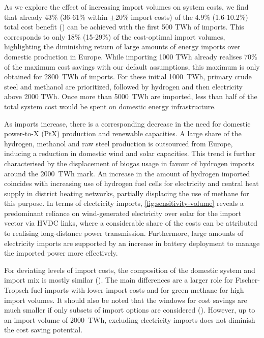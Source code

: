 As we explore the effect of increasing import volumes on system costs, we find
that already 43\% (36-61\% within $\pm$20\% import costs) of the 4.9\%
(1.6-10.2\%) total cost benefit () can be achieved with the first 500
TWh of imports. This corresponds to only 18\% (15-29\%) of the cost-optimal
import volumes, highlighting the diminishing return of large amounts of energy
imports over domestic production in Europe. While importing 1000 TWh already
realises 70\% of the maximum cost savings with our default assumptions, this
maximum is only obtained for 2800~TWh of imports. For these initial 1000~TWh,
primary crude steel and methanol are prioritized, followed by hydrogen and then
electricity above 2000 TWh. Once more than 5000~TWh are imported, less than half
of the total system cost would be spent on domestic energy infrastructure.

As imports increase, there is a corresponding decrease in the need for domestic
power-to-X (PtX) production and renewable capacities. A large share of the
hydrogen, methanol and raw steel production is outsourced from Europe, inducing
a reduction in domestic wind and solar capacities. This trend is further
characterised by the displacement of biogas usage in favour of hydrogen imports
around the 2000~TWh mark. An increase in the amount of hydrogen imported
coincides with increasing use of hydrogen fuel cells for electricity and central
heat supply in district heating networks, partially displacing the use of
methane for this purpose. In terms of electricity imports,
\cref{fig:sensitivity-volume} reveals a predominant reliance on wind-generated
electricity over solar for the import vector via HVDC links, where a
considerable share of the costs can be attributed to realising long-distance
power transmission. Furthermore, large amounts of electricity imports are
supported by an increase in battery deployment to manage the imported power more
effectively.

For deviating levels of import costs, the composition of the domestic system and
import mix is mostly similar (). The main differences are
a larger role for Fischer-Tropsch fuel imports with lower import costs and for
green methane for high import volumes. It should also be noted that the windows
for cost savings are much smaller if only subsets of import options are
considered (). However, up to an import volume of 2000~TWh,
excluding electricity imports does not diminish the cost saving potential.

